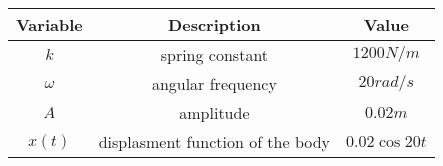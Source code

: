 \begin{tabular}[12.1pt]{ |c| c| c|}
    \hline
    \textbf{Variable} & \textbf{Description} &\textbf{Value}\\ 
    \hline
    $k$ & spring constant & $1200 N/m$ \\
    \hline 
    $\omega$ & angular frequency  & $20 rad/s$ \\
    \hline
    $A$ &amplitude &$0.02 m$\\
    \hline
    $x(t)$ & displasment function of the body & $0.02\cos{20t}$\\
    \hline

    \end{tabular}
